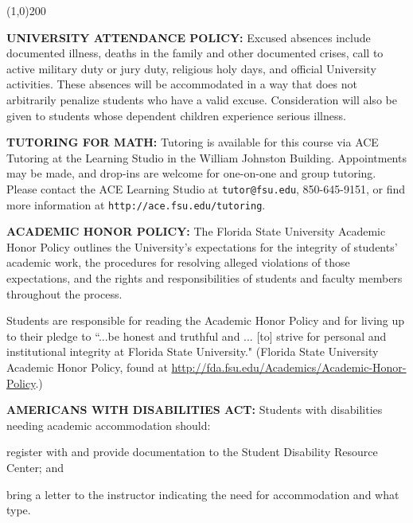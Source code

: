 \documentclass[12pt,oneside]{amsart}
\begin{document}
\vspace{-2mm}
\begin{center}
	\line(1,0){200}
\end{center}

\noindent \textbf{UNIVERSITY ATTENDANCE POLICY:} Excused absences include documented illness, deaths in the family and other documented crises, call to active military duty or jury duty, religious holy days, and official University activities. These absences will be accommodated in a way that does not arbitrarily penalize students who have a valid excuse. Consideration will also be given to students whose dependent children experience serious illness.

\noindent \textbf{TUTORING FOR MATH:} Tutoring is available for this course via ACE Tutoring at the Learning Studio in the William Johnston Building.  Appointments may be made, and drop-ins are welcome for one-on-one and group tutoring.  Please contact the ACE Learning Studio at \texttt{tutor@fsu.edu}, 850-645-9151, or find more information at \texttt{http://ace.fsu.edu/tutoring}.

\noindent \textbf{ACADEMIC HONOR POLICY:} The Florida State University Academic Honor Policy outlines the University's expectations for the integrity of students' academic work, the procedures for resolving alleged violations of those expectations, and the rights and responsibilities of students and faculty members throughout the process. \vspace{-3mm}

Students are responsible for reading the Academic Honor Policy and for living up to their pledge to ``...be honest and truthful and ... [to] strive for personal and institutional integrity at Florida State University." (Florida State University Academic Honor Policy, found at \url{http://fda.fsu.edu/Academics/Academic-Honor-Policy}.)

\noindent \textbf{AMERICANS WITH DISABILITIES ACT:} Students with disabilities needing academic accommodation should: \begin{enumerate*}[label=(\arabic*), topsep=1.5mm, itemsep=1.5mm]\item register with and provide documentation to the Student Disability Resource Center; and \item bring a letter to the instructor indicating the need for accommodation and what type.\end{enumerate*}\vspace{-3mm}
\end{document}
